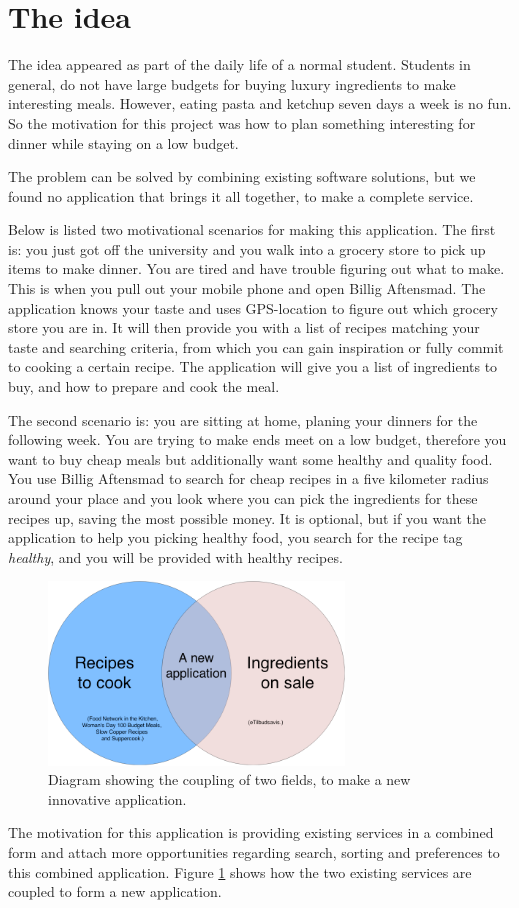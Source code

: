 \section{The idea}
\label{sec:theidea}

The idea appeared as part of the daily life of a normal student. Students in general, do not have large budgets for buying luxury ingredients to make interesting meals. However, eating pasta and ketchup seven days a week is no fun. So the motivation for this project was how to plan something interesting for dinner while staying on a low budget. 

The problem can be solved by combining existing software solutions, but we found no application that brings it all together, to make a complete service.

Below is listed two motivational scenarios for making this application. The first is: you just got off the university and you walk into a grocery store to pick up items to make dinner. You are tired and have trouble figuring out what to make. This is when you pull out your mobile phone and open Billig Aftensmad. The application knows your taste and uses GPS-location to figure out which grocery store you are in. It will then provide you with a list of recipes matching your taste and searching criteria, from which you can gain inspiration or fully commit to cooking a certain recipe. The application will give you a list of ingredients to buy, and how to prepare and cook the meal.

The second scenario is: you are sitting at home, planing your dinners for the following week. You are trying to make ends meet on a low budget, therefore you want to buy cheap meals but additionally want some healthy and quality food. You use Billig Aftensmad to search for cheap recipes in a five kilometer radius around your place and you look where you can pick the ingredients for these recipes up, saving the most possible money. It is optional, but if you want the application to help you picking healthy food, you search for the recipe tag \textit{healthy}, and you will be provided with healthy recipes.

\begin{figure}[H]
	\centering
	\includegraphics[width=0.7\textwidth]{Pictures/theideadiagram.png}
	\caption{Diagram showing the coupling of two fields, to make a new innovative application.}
	\label{fig:theideaasdiagram}
\end{figure}

The motivation for this application is providing existing services in a combined form and attach more opportunities regarding search, sorting and preferences to this combined application. Figure \ref{fig:theideaasdiagram} shows how the two existing services are coupled to form a new application.